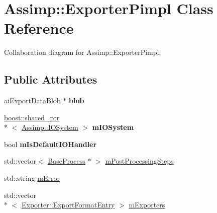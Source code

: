 \hypertarget{class_assimp_1_1_exporter_pimpl}{\section{Assimp\+:\+:Exporter\+Pimpl Class Reference}
\label{class_assimp_1_1_exporter_pimpl}
}


Collaboration diagram for Assimp\+:\+:Exporter\+Pimpl\+:
\subsection*{Public Attributes}
\begin{DoxyCompactItemize}
\item 
\hypertarget{class_assimp_1_1_exporter_pimpl_a8554003452a24ba8d5e7605b8632cf9c}{\hyperlink{structai_export_data_blob}{ai\+Export\+Data\+Blob} $\ast$ {\bfseries blob}}\label{class_assimp_1_1_exporter_pimpl_a8554003452a24ba8d5e7605b8632cf9c}

\item 
\hypertarget{class_assimp_1_1_exporter_pimpl_a1dea3158ef44fd7db68f04ad62270294}{\hyperlink{classboost_1_1shared__ptr}{boost\+::shared\+\_\+ptr}\\*
$<$ \hyperlink{class_assimp_1_1_i_o_system}{Assimp\+::\+I\+O\+System} $>$ {\bfseries m\+I\+O\+System}}\label{class_assimp_1_1_exporter_pimpl_a1dea3158ef44fd7db68f04ad62270294}

\item 
\hypertarget{class_assimp_1_1_exporter_pimpl_a4f30964f8a034e402e28d3b6d90d091d}{bool {\bfseries m\+Is\+Default\+I\+O\+Handler}}\label{class_assimp_1_1_exporter_pimpl_a4f30964f8a034e402e28d3b6d90d091d}

\item 
std\+::vector$<$ \hyperlink{class_assimp_1_1_base_process}{Base\+Process} $\ast$ $>$ \hyperlink{class_assimp_1_1_exporter_pimpl_a8536b3110b24365d3b8258ab7c08c214}{m\+Post\+Processing\+Steps}
\item 
std\+::string \hyperlink{class_assimp_1_1_exporter_pimpl_a8a892776135cbd3b2eff2270a7dbf254}{m\+Error}
\item 
std\+::vector\\*
$<$ \hyperlink{struct_assimp_1_1_exporter_1_1_export_format_entry}{Exporter\+::\+Export\+Format\+Entry} $>$ \hyperlink{class_assimp_1_1_exporter_pimpl_a4db7a735e7faf181a69a04d8e5777f87}{m\+Exporters}
\end{DoxyCompactItemize}


